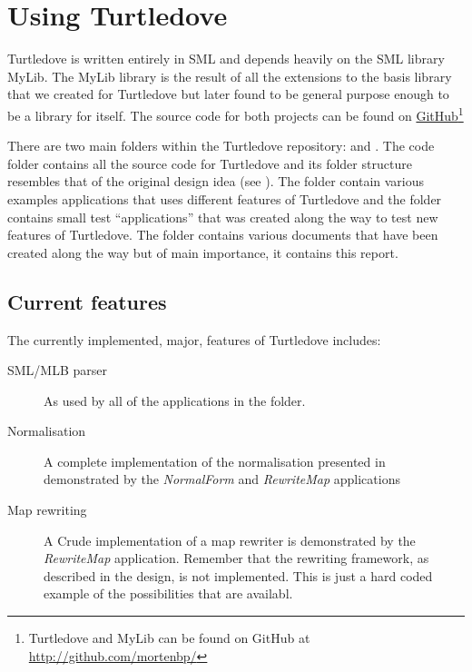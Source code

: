 \chapter{Using Turtledove}

Turtledove is written entirely in SML and depends heavily on the SML library
MyLib. The MyLib library is the result of all the extensions to the basis
library that we created for Turtledove but later found to be general purpose
enough to be a library for itself. The source code for both projects can be
found on \href{http://github.com/mortenbp/}{GitHub}\footnote{Turtledove and
  MyLib can be found on GitHub at \url{http://github.com/mortenbp/}}

There are two main folders within the Turtledove repository:  and
. The code folder contains all the source code for Turtledove and
its folder structure resembles that of the original design idea (see
). The  folder contain various examples
applications that uses different features of Turtledove and the 
folder contains small test ``applications'' that was created along the way to
test new features of Turtledove. The  folder contains various
documents that have been created along the way but of main importance, it
contains this report.

\section{Current features}

The currently implemented, major, features of Turtledove includes:

\begin{description}
\item[SML/MLB parser] As used by all of the applications in the 
  folder.

\item[Normalisation] A complete implementation of the normalisation presented in
   demonstrated by the \textit{NormalForm} and
  \textit{RewriteMap} applications

\item[Map rewriting] A Crude implementation of a map rewriter is demonstrated by
  the \textit{RewriteMap} application. Remember that the rewriting framework, as
  described in the design, is not implemented. This is just a hard coded example
  of the possibilities that are availabl.
\end{description}

